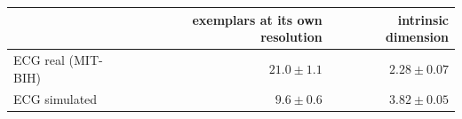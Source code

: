 \begin{tabular}{lrr}
\toprule
 & exemplars at its own resolution & intrinsic dimension \\
\midrule
ECG real (MIT-BIH) & $21.0 \pm 1.1$ & $2.28 \pm 0.07$ \\
ECG simulated & $9.6 \pm 0.6$ & $3.82 \pm 0.05$ \\
\bottomrule
\end{tabular}
